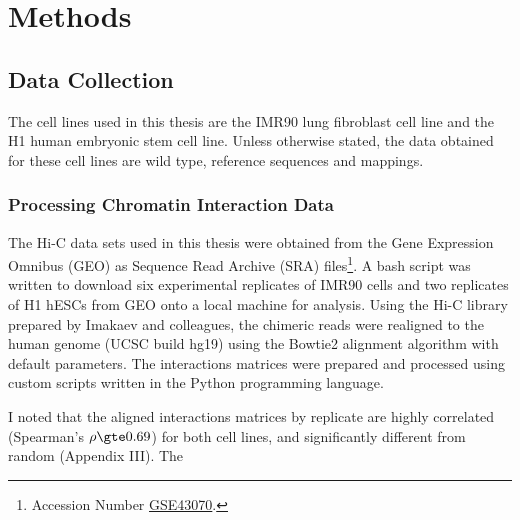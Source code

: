 \documentclass[phd,tocprelim]{cornell}
\begin{document}


\chapter{Methods}

\section{Data Collection}

The cell lines used in this thesis are the IMR90 lung fibroblast cell line and the H1 human embryonic stem
cell line.  Unless otherwise stated, the data obtained for these cell lines are wild type, reference sequences
and mappings.

\subsection{Processing Chromatin Interaction Data}

The Hi-C data sets used in this thesis were obtained from the Gene Expression Omnibus (GEO)\cite{edgar2002}
as Sequence Read Archive (SRA) files\footnote{Accession Number %
\href{http://www.ncbi.nlm.nih.gov/geo/query/acc.cgi?acc=GSE43070}{GSE43070}.}.  A bash script was written
to download six experimental replicates of IMR90 cells and two replicates of H1 hESCs from GEO onto a
local machine for analysis.  Using the Hi-C library prepared by Imakaev and colleagues\cite{imakaev2012},
the chimeric reads were realigned to the human genome (UCSC build hg19) using the Bowtie2 alignment
algorithm\cite{langmead2012} with default parameters.  The interactions matrices were prepared and processed
using custom scripts written in the Python programming language.

I noted that the aligned interactions matrices by replicate are highly correlated (Spearman's $\rho \gte 0.69$)  %
for both cell lines, and significantly different from random (Appendix III).  The

\end{document}
